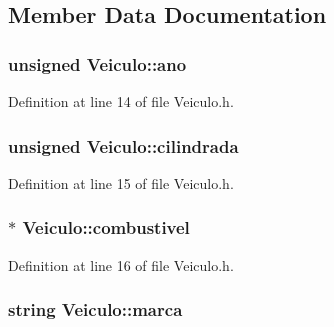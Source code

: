\subsection{Member Data Documentation}
\hypertarget{class_veiculo_ae141824a9353b3f7ed99d5c34c830fe2}{
\subsubsection[{ano}]{\setlength{\rightskip}{0pt plus 5cm}unsigned Veiculo\+::ano\hspace{0.3cm}{\ttfamily [private]}}}\label{class_veiculo_ae141824a9353b3f7ed99d5c34c830fe2}


Definition at line 14 of file Veiculo.\+h.

\hypertarget{class_veiculo_a3c3b3f2f958a98b48fa5e4f46007c9f9}{
\subsubsection[{cilindrada}]{\setlength{\rightskip}{0pt plus 5cm}unsigned Veiculo\+::cilindrada\hspace{0.3cm}{\ttfamily [private]}}}\label{class_veiculo_a3c3b3f2f958a98b48fa5e4f46007c9f9}


Definition at line 15 of file Veiculo.\+h.

\hypertarget{class_veiculo_ad8416cc9da449baed5e07ed146572712}{
\subsubsection[{combustivel}]{$\ast$ Veiculo\+::combustivel\hspace{0.3cm}{\ttfamily [private]}}}\label{class_veiculo_ad8416cc9da449baed5e07ed146572712}


Definition at line 16 of file Veiculo.\+h.

\hypertarget{class_veiculo_ab20b89442a0ddaedd074bb0de75838c8}{
\subsubsection[{marca}]{\setlength{\rightskip}{0pt plus 5cm}string Veiculo\+::marca\hspace{0.3cm}{\ttfamily [private]}}}\label{class_veiculo_ab20b89442a0ddaedd074bb0de75838c8}



